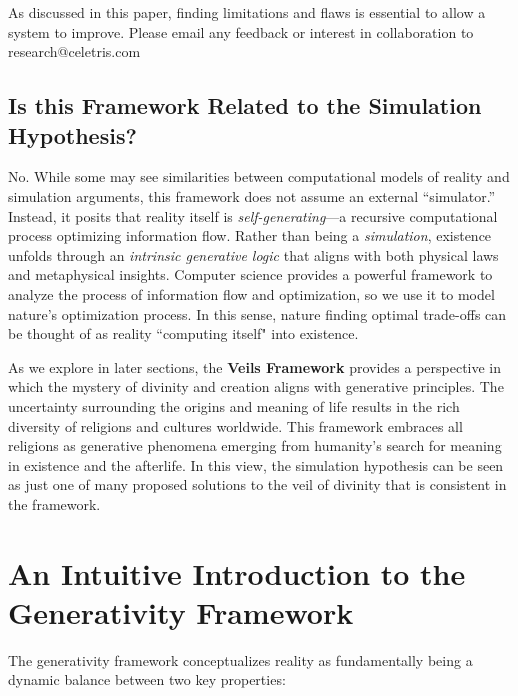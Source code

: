 \documentclass[12pt]{article}
\begin{document}
As discussed in this paper, finding limitations and flaws is essential to allow a system to improve. Please email any feedback or interest in collaboration to research@celetris.com

\subsection{Is this Framework Related to the Simulation Hypothesis?}
No. While some may see similarities between computational models of reality and simulation arguments, this framework does not assume an external “simulator.” Instead, it posits that reality itself is \textit{self-generating}—a recursive computational process optimizing information flow. Rather than being a \textit{simulation}, existence unfolds through an \textit{intrinsic generative logic} that aligns with both physical laws and metaphysical insights. Computer science provides a powerful framework to analyze the process of information flow and optimization, so we use it to model nature's optimization process. In this sense, nature finding optimal trade-offs can be thought of as reality ``computing itself" into existence.

As we explore in later sections, the \textbf{Veils Framework} provides a perspective in which the mystery of divinity and creation aligns with generative principles. The uncertainty surrounding the origins and meaning of life results in the rich diversity of religions and cultures worldwide. This framework embraces all religions as generative phenomena emerging from humanity's search for meaning in existence and the afterlife. In this view, the simulation hypothesis can be seen as just one of many proposed solutions to the veil of divinity that is consistent in the framework.


\section{An Intuitive Introduction to the Generativity Framework}
The generativity framework conceptualizes reality as fundamentally being a dynamic balance between two key properties:
\end{document}
